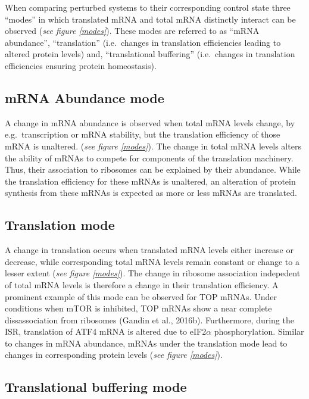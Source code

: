 \documentclass[12pt,openany]{book}
\begin{document}
When comparing perturbed systems to their corresponding control state
three ``modes'' in which translated mRNA and total mRNA distinctly
interact can be observed (\emph{see figure \ref{modes}}). These modes
are referred to as ``mRNA abundance'', ``translation'' (i.e.~changes in
translation efficiencies leading to altered protein levels) and,
``translational buffering'' (i.e.~changes in translation efficiencies
ensuring protein homeostasis).

\subsection{mRNA Abundance mode}

A change in mRNA abundance is observed when total mRNA levels change, by
e.g.~transcription or mRNA stability, but the translation efficiency of
those mRNA is unaltered. (\emph{see figure \ref{modes}}). The change in
total mRNA levels alters the ability of mRNAs to compete for components
of the translation machinery. Thus, their association to ribosomes can
be explained by their abundance. While the translation efficiency for
these mRNAs is unaltered, an alteration of protein synthesis from these
mRNAs is expected as more or less mRNAs are translated.

\subsection{Translation mode}

A change in translation occurs when translated mRNA levels either
increase or decrease, while corresponding total mRNA levels remain
constant or change to a lesser extent (\emph{see figure \ref{modes}}).
The change in ribosome association indepedent of total mRNA levels is
therefore a change in their translation efficiency. A prominent example
of this mode can be observed for TOP mRNAs. Under conditions when mTOR
is inhibited, TOP mRNAs show a near complete dissassociation from
ribosomes (Gandin et al., 2016b). Furthermore, during the ISR,
translation of ATF4 mRNA is altered due to eIF2\(\alpha\)
phosphorylation. Similar to changes in mRNA abundance, mRNAs under the
translation mode lead to changes in corresponding protein levels
(\emph{see figure \ref{modes}}).

\subsection{Translational buffering mode} \label{modeBuffering}
\end{document}
